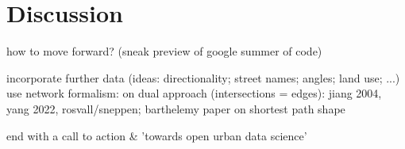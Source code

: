 \section{Discussion}
\label{sec:discussion}

how to move forward? (sneak preview of google summer of code)

incorporate further data (ideas: directionality; street names; angles; land use; ...)
use network formalism: on dual approach (intersections = edges): jiang 2004, yang 2022, rosvall/sneppen; barthelemy paper on shortest path shape

end with a call to action \& 'towards open urban data science' 